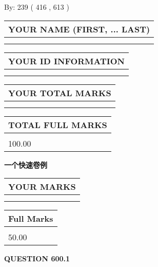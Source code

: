 \documentclass{ctexart}
\begin{document}
   
\hspace{1.0in} By: 
 239 ( 416 ,  613 )
   
   
   
   
\newpage 
\setcounter{page}{ 
   600001 } 
   
   
   
   
\noindent\begin{tabular}{|l|}
\hline
YOUR NAME (FIRST, ... LAST)  \\
\hline
 \\ 
 \\ 
\hline
\end{tabular}
\hspace{0.05in} \begin{tabular}{|l|}
\hline
 YOUR   ID   INFORMATION  \\
\hline
 \\ 
 \\ 
\hline
\end{tabular}
   
   
\vspace{0.2in}\noindent\begin{tabular}{|l|}
\hline
YOUR TOTAL MARKS  \\
\hline
 \\ 
 \\ 
\hline
\end{tabular}
\hspace{0.05in} \begin{tabular}{|l|}
\hline
TOTAL FULL MARKS  \\
\hline
 \\ 
100.00 \\
\hline
\end{tabular}
   
   
 \vspace{0.2in}
{\LARGE {\textbf{ 一个快速卷例}}}
   
   
  
\vspace{0.2in}
  
\noindent\begin{tabular}{|l|}
\hline
 YOUR MARKS  \\
\hline
 \\ 
 \\ 
\hline
\end{tabular}
\hspace{0.05in} \begin{tabular}{|l|}
\hline
 Full Marks  \\
\hline
 \\ 
50.00 \\
\hline
\end{tabular}
{\textbf{\Large{QUESTION
600.1 
}}}
  
\end{document}
